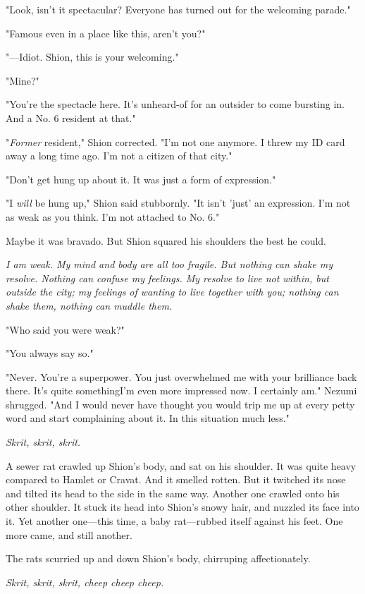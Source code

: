 "Look, isn't it spectacular? Everyone has turned out for the welcoming
parade."

"Famous even in a place like this, aren't you?"

"---Idiot. Shion, this is your welcoming."

"Mine?"

"You're the spectacle here. It's unheard-of for an outsider to come
bursting in. And a No. 6 resident at that."

"\emph{Former} resident," Shion corrected. "I'm not one anymore. I threw my ID
card away a long time ago. I'm not a citizen of that city."

"Don't get hung up about it. It was just a form of expression."

"I \emph{will} be hung up," Shion said stubbornly. "It isn't 'just' an
expression. I'm not as weak as you think. I'm not attached to No. 6."

Maybe it was bravado. But Shion squared his shoulders the best he could.

\emph{I am weak. My mind and body are all too fragile. But nothing can shake
my resolve. Nothing can confuse my feelings. My resolve to live not
within, but outside the city; my feelings of wanting to live together
with you; nothing can shake them, nothing can muddle them.}

"Who said you were weak?"

"You always say so."

"Never. You're a superpower. You just overwhelmed me with your
brilliance back there. It's quite something\el I'm even more impressed
now. I certainly am." Nezumi shrugged. "And I would never have thought
you would trip me up at every petty word and start complaining about it.
In this situation much less."

\emph{Skrit, skrit, skrit.}

A sewer rat crawled up Shion's body, and sat on his shoulder. It was
quite heavy compared to Hamlet or Cravat. And it smelled rotten. But it
twitched its nose and tilted its head to the side in the same way.
Another one crawled onto his other shoulder. It stuck its head into
Shion's snowy hair, and nuzzled its face into it. Yet another one---this
time, a baby rat---rubbed itself against his feet. One more came, and
still another.

The rats scurried up and down Shion's body, chirruping affectionately.

\emph{Skrit, skrit, skrit, cheep cheep cheep.}

